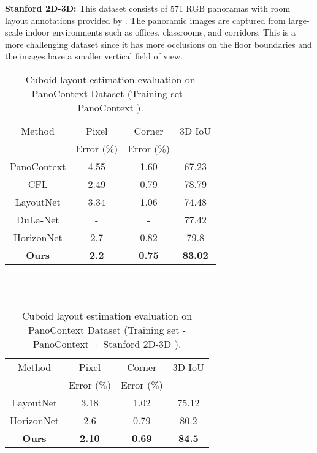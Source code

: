 \documentclass[final]{cvpr}
\begin{document}
\textbf{Stanford 2D-3D:} This dataset consists of 571 RGB panoramas with room layout annotations provided by \cite{zou2018layoutnet}. The panoramic images are captured from large-scale indoor environments such as offices, classrooms, and corridors. This is a more challenging dataset since it has more occlusions on the floor boundaries and the images have a smaller vertical field of view.



\begin{table}[t]
\centering
 \begin{tabular}{||c c c c||} 
 \hline
 Method & Pixel & Corner & 3D IoU \\ [0.5ex] 
  &Error ($\%$)&Error ($\%$)&\\[0.5ex]
 \hline\hline
 PanoContext \cite{zhang2014panocontext} & 4.55 & 1.60 & 67.23 \\ 
 \hline
 CFL \cite{fernandez2020corners} & 2.49 & 0.79 & 78.79 \\
 \hline
 LayoutNet \cite{zou2018layoutnet} & 3.34 & 1.06 & 74.48 \\
 \hline
 DuLa-Net \cite{yang2019dula} & - & - & 77.42 \\
 \hline
 HorizonNet \cite{sun2019horizonnet} & 2.7 & 0.82 &  79.8\\
 \hline
 \textbf{Ours} &  \textbf{2.2}&  \textbf{0.75}&  \textbf{83.02}\\
 \hline
\end{tabular} \\~\\
 \label{tab:Table1}
\caption{Cuboid layout estimation evaluation on PanoContext Dataset \cite{zhang2014panocontext} (Training set - PanoContext \cite{zhang2014panocontext}).}
\end{table}

\begin{table}[t]
\centering
 \begin{tabular}{||c c c c||} 
 \hline
 Method & Pixel & Corner & 3D IoU \\ [0.5ex] 
  & Error ($\%$)& Error ($\%$)&\\[0.5ex]
 \hline\hline
 LayoutNet \cite{zou2018layoutnet} & 3.18 & 1.02 & 75.12 \\
 \hline
 HorizonNet \cite{sun2019horizonnet} &  2.6 & 0.79 & 80.2 \\
 \hline
 \textbf{Ours} & \textbf{2.10} & \textbf{0.69} & \textbf{84.5} \\  
 \hline
\end{tabular} \\~\\
\caption{Cuboid layout estimation evaluation on PanoContext Dataset \cite{zhang2014panocontext} (Training set - PanoContext \cite{zhang2014panocontext} + Stanford 2D-3D \cite{armeni2017joint}). }
\label{tab:Table2}
\end{table}
\end{document}
